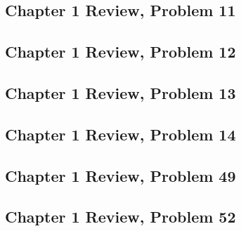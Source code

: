 \documentclass[10pt]{mypackage}
\begin{document}
\subsection{Chapter 1 Review, Problem 11}%
\subsection{Chapter 1 Review, Problem 12}%
\subsection{Chapter 1 Review, Problem 13}%
\subsection{Chapter 1 Review, Problem 14}%
\subsection{Chapter 1 Review, Problem 49}%
\subsection{Chapter 1 Review, Problem 52}%
\end{document}
